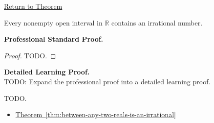 \newpage
{}
\label{prf:irrationals-dense-in-r}

\begin{remark*}[Return]
\hyperref[cor:irrationals-dense-in-r]{Return to Theorem}
\end{remark*}

\begin{theorem*}
Every nonempty open interval in $\mathbb{R}$ contains an irrational number.
\end{theorem*}

\textbf{Professional Standard Proof.}~\\
\begin{proof}
TODO.
\end{proof}

\textbf{Detailed Learning Proof.}~\\
TODO: Expand the professional proof into a detailed learning proof.


\begin{remark*}
TODO.
\end{remark*}

\begin{dependencies}
\begin{itemize}
  \item \hyperref[thm:between-any-two-reals-is-an-irrational]{Theorem~\ref*{thm:between-any-two-reals-is-an-irrational}}
\end{itemize}
\end{dependencies}


